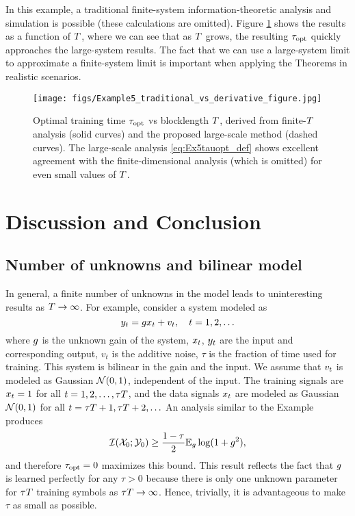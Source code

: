 \documentclass[12pt, draftclsnofoot,journal,onecolumn]{IEEEtran}
\begin{document}
In this example, a traditional finite-system information-theoretic analysis and simulation is possible (these calculations are omitted). Figure \ref{fig:example_compare_triditional_and_derivative} shows the results as a function of $T$, where we can see that as $T$ grows, the resulting $\tau_{{\rm opt}}$ quickly approaches the large-system results.  The fact that we can use a large-system limit to approximate a finite-system limit is important when applying the Theorems in realistic scenarios.

\begin{figure}
\texttt{[image: figs/Example5\_traditional\_vs\_derivative\_figure.jpg]}
\centering
    \caption{Optimal training time $\tau_{{\rm opt}}$ vs blocklength $T$, derived from finite-$T$ analysis (solid curves) and the proposed large-scale method (dashed curves).  The large-scale analysis \eqref{eq:Ex5tauopt_def} shows excellent agreement with the finite-dimensional analysis (which is omitted) for even small values of $T$.}
    \label{fig:example_compare_triditional_and_derivative}
\end{figure}


\section{Discussion and Conclusion}
\label{sec:discussion}

\subsection{Number of unknowns and bilinear model}
In general, a finite number of unknowns in the model leads to uninteresting results as $T\rightarrow\infty$.  For example, consider a system modeled as
\begin{equation*}
    y_{t} = gx_t +v_t,\quad t=1,2,\ldots
\end{equation*}
where $g$ is the unknown gain of the system, $x_t$, $y_t$ are the input and corresponding output, $v_t$ is the additive noise, $\tau$ is the fraction of time used for training.  This system is bilinear in the gain and the input.  We assume that $v_t$ is modeled as \iid Gaussian $\mathcal{N}(0,1)$, independent of the input. The training signals are $x_t=1$ for all $t=1,2,\ldots, {\tau T}$, and the data signals $x_t$ are modeled as \iid Gaussian $\mathcal{N}(0,1)$ for all $t={\tau T}+1,{\tau T}+2,\ldots$ An analysis similar to the Example produces
\begin{align*}
    \mathcal{I}({\mathcal{X}_0};{\mathcal{Y}_0}{}) \geq\frac{1-\tau}{2}\mathbb{E}_{g}\log(1+g^2),
\end{align*}
and therefore $\tau_{{\rm opt}}=0$ maximizes this bound. This result reflects the fact that $g$ is learned perfectly for any $\tau>0$ because there is only one unknown parameter for ${\tau T}$ training symbols as ${\tau T}\rightarrow\infty$.  Hence, trivially, it is advantageous to make $\tau$ as small as possible.
\end{document}
